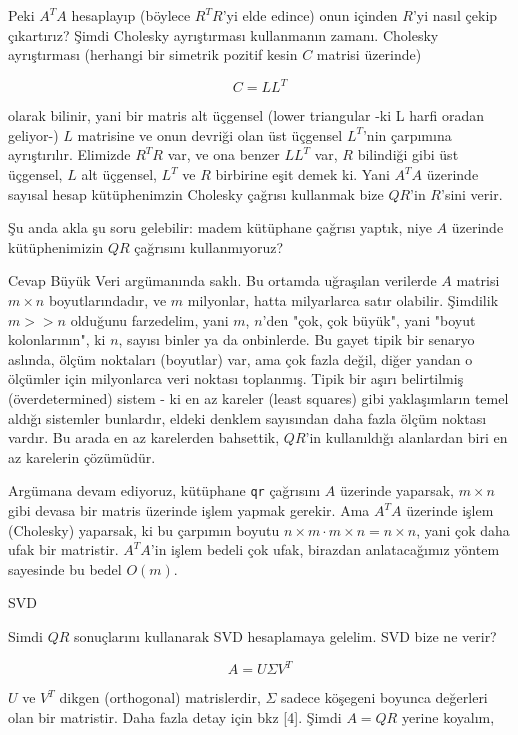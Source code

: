 \documentclass[12pt,fleqn]{article}\usepackage{../../common}
\begin{document}
Peki $A^TA$ hesaplayıp (böylece $R^TR$'yi elde edince) onun içinden $R$'yi nasıl
çekip çıkartırız? Şimdi Cholesky ayrıştırması kullanmanın zamanı. Cholesky
ayrıştırması (herhangi bir simetrik pozitif kesin $C$ matrisi üzerinde)

$$C = LL^T$$

olarak bilinir, yani bir matris alt üçgensel (lower triangular -ki L harfi
oradan geliyor-) $L$ matrisine ve onun devriği olan üst üçgensel $L^T$'nin
çarpımına ayrıştırılır. Elimizde $R^TR$ var, ve ona benzer $LL^T$ var, $R$
bilindiği gibi üst üçgensel, $L$ alt üçgensel, $L^T$ ve $R$ birbirine eşit demek
ki. Yani $A^TA$ üzerinde sayısal hesap kütüphenimzin Cholesky çağrısı kullanmak
bize $QR$'in $R$'sini verir.

Şu anda akla şu soru gelebilir: madem kütüphane çağrısı yaptık, niye $A$
üzerinde kütüphenimizin $QR$ çağrısını kullanmıyoruz?

Cevap Büyük Veri argümanında saklı. Bu ortamda uğraşılan verilerde $A$ matrisi
$m \times n$ boyutlarındadır, ve $m$ milyonlar, hatta milyarlarca satır
olabilir. Şimdilik $m >> n$ olduğunu farzedelim, yani $m$, $n$'den "çok, çok
büyük", yani "boyut kolonlarının", ki $n$, sayısı binler ya da onbinlerde. Bu
gayet tipik bir senaryo aslında, ölçüm noktaları (boyutlar) var, ama çok fazla
değil, diğer yandan o ölçümler için milyonlarca veri noktası toplanmış. Tipik
bir aşırı belirtilmiş (överdetermined) sistem - ki en az kareler (least squares)
gibi yaklaşımların temel aldığı sistemler bunlardır, eldeki denklem sayısından
daha fazla ölçüm noktası vardır. Bu arada en az karelerden bahsettik, $QR$'in
kullanıldığı alanlardan biri en az karelerin çözümüdür.

Argümana devam ediyoruz, kütüphane \verb!qr! çağrısını $A$ üzerinde yaparsak, $m
\times n$ gibi devasa bir matris üzerinde işlem yapmak gerekir. Ama $A^TA$
üzerinde işlem (Cholesky) yaparsak, ki bu çarpımın boyutu $n \times m \cdot m
\times n = n \times n$, yani çok daha ufak bir matristir. $A^TA$'in işlem bedeli
çok ufak, birazdan anlatacağımız yöntem sayesinde bu bedel $O(m)$.

SVD

Simdi $QR$ sonuçlarını kullanarak SVD hesaplamaya gelelim. SVD bize ne verir?

$$ A = U \Sigma V^T $$

$U$ ve $V^T$ dikgen (orthogonal) matrislerdir, $\Sigma$ sadece köşegeni
boyunca değerleri olan bir matristir. Daha fazla detay için bkz [4]. Şimdi
$A = QR$ yerine koyalım,
\end{document}
